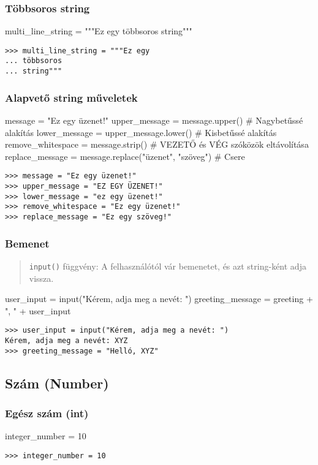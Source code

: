 \subsubsection{Többsoros string}
\begin{pycode}
    multi_line_string = """Ez egy
    többsoros
    string"""
\end{pycode}
\begin{verbatim}
>>> multi_line_string = """Ez egy
... többsoros
... string"""
\end{verbatim}

\subsubsection{Alapvető string műveletek}
\begin{pycode}
message = "Ez egy üzenet!"
upper_message = message.upper() # Nagybetűssé alakítás
lower_message = upper_message.lower() # Kisbetűssé alakítás
remove_whitespace = message.strip() # VEZETŐ és VÉG szóközök eltávolítása
replace_message = message.replace("üzenet", "szöveg") # Csere
\end{pycode}
\begin{verbatim}
>>> message = "Ez egy üzenet!"
>>> upper_message = "EZ EGY ÜZENET!"
>>> lower_message = "ez egy üzenet!"
>>> remove_whitespace = "Ez egy üzenet!"
>>> replace_message = "Ez egy szöveg!"
\end{verbatim}

\subsubsection{Bemenet}
\begin{quote}
    \texttt{input()} függvény: A felhasználótól vár bemenetet, és azt string-ként adja vissza.
\end{quote}
\begin{pycode}
    user_input = input("Kérem, adja meg a nevét: ")
    greeting_message = greeting + ", " + user_input
\end{pycode}
\begin{verbatim}
>>> user_input = input("Kérem, adja meg a nevét: ")
Kérem, adja meg a nevét: XYZ
>>> greeting_message = "Helló, XYZ"
\end{verbatim}

\subsection{Szám (Number)}
\subsubsection{Egész szám (int)}
\begin{pycode}
    integer_number = 10
\end{pycode}
\begin{verbatim}
>>> integer_number = 10
\end{verbatim}

